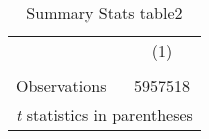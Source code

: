\begin{table}[htbp]\centering
\caption{Summary Stats table2\label{tab1}}
\begin{tabular}{l*{1}{c}}
\hline\hline
                    &\multicolumn{1}{c}{(1)}\\
                    &\multicolumn{1}{c}{}\\
\hline
\hline
Observations        &     5957518\\
\hline\hline
\multicolumn{2}{l}{\footnotesize \textit{t} statistics in parentheses}\\
\end{tabular}
\end{table}
